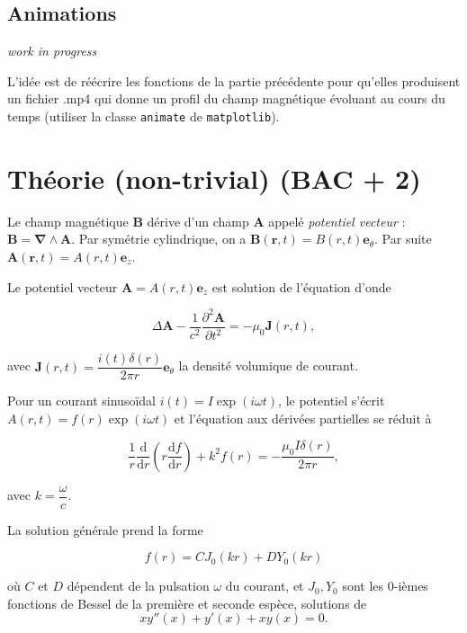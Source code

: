 \documentclass[11pt]{article}
\begin{document}
    \subsection{Animations}\label{animations}

    \emph{work in progress}

L'idée est de réécrire les fonctions de la partie précédente pour
qu'elles produisent un fichier .mp4 qui donne un profil du champ
magnétique évoluant au cours du temps (utiliser la classe
\texttt{animate} de \texttt{matplotlib}).

    \section{Théorie (non-trivial) (BAC +
2)}\label{thuxe9orie-non-trivial-bac-2}

    Le champ magnétique \(\mathbf{B}\) dérive d'un champ \(\mathbf A\)
appelé \emph{potentiel vecteur} :
\(\mathbf{B} = \boldsymbol\nabla\wedge\mathbf{A}\). Par symétrie
cylindrique, on a
\(\mathbf{B}(\mathbf r, t) = B(r,t)\mathbf{e}_\theta\). Par suite
\(\mathbf A(\mathbf r,t) = A(r,t)\mathbf e_z\).

    Le potentiel vecteur \(\mathbf{A} = A(r,t)\mathbf{e}_z\) est solution de
l'équation d'onde

\begin{equation}
\Delta\mathbf A  - \frac{1}{c^2}\frac{\partial^2\mathbf A}{\partial t^2} = - \mu_0\mathbf{J}(r,t),
\end{equation}

avec \(\mathbf J(r,t) = \dfrac{i(t)\delta(r)}{2\pi r}\mathbf{e}_\theta\)
la densité volumique de courant.

Pour un courant sinusoïdal \(i(t) = I\exp(i\omega t)\), le potentiel
s'écrit \(A(r,t) = f(r)\exp(i\omega t)\) et l'équation aux dérivées
partielles se réduit à

\begin{equation}
\frac{1}{r}\frac{\mathrm d}{\mathrm dr}\left(r\frac{\mathrm df}{\mathrm dr} \right) + k^2f(r) = -\frac{\mu_0I\delta(r)}{2\pi r},
\end{equation}

avec \(k=\dfrac{\omega}{c}\).

La solution générale prend la forme

\[
f(r) = CJ_0(kr) + DY_0(kr)
\]

où \(C\) et \(D\) dépendent de la pulsation \(\omega\) du courant, et
\(J_0,Y_0\) sont les 0-ièmes fonctions de Bessel de la première et
seconde espèce, solutions de \[xy''(x) + y'(x) + xy(x) = 0.\]


    
    
    
    
\end{document}

